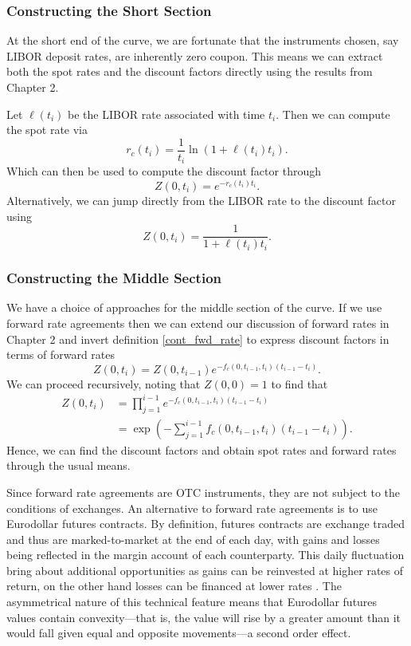 \subsubsection{Constructing the Short Section}
At the short end of the curve, we are fortunate that the instruments chosen, say LIBOR deposit rates, are inherently zero coupon. This means we can extract both the spot rates and the discount factors directly using the results from Chapter 2.

Let $\ell(t_i)$ be the LIBOR rate associated with time $t_i$. Then we can compute the spot rate via
\begin{equation}
    r_c(t_i) = \frac{1}{t_i} \ln ( 1 + \ell(t_i) t_i).
\end{equation}
Which can then be used to compute the discount factor through
\begin{equation}
    Z(0,t_i) = e^{-r_c(t_i) t_i}.
\end{equation}
Alternatively, we can jump directly from the LIBOR rate to the discount factor using
\begin{equation}
    Z(0,t_i) = \frac{1}{1 + \ell(t_i) t_i}.
\end{equation}

\subsubsection{Constructing the Middle Section}
We have a choice of approaches for the middle section of the curve. If we use forward rate agreements then we can extend our discussion of forward rates in Chapter 2 and invert definition \ref{cont_fwd_rate} to express discount factors in terms of forward rates
\begin{equation}
    Z(0,t_i) = Z(0,t_{i-1}) e^{- f_c(0,t_{i-1},t_i) (t_{i-1} - t_i)}.
\end{equation}
We can proceed recursively, noting that $Z(0,0) = 1$ to find that
\begin{align}
    Z(0,t_i) &= \prod_{j=1}^{i-1} e^{- f_c(0,t_{i-1},t_i) (t_{i-1} - t_i)} \\
    &= \exp \left( - \sum_{j=1}^{i-1} f_c(0,t_{i-1},t_i) (t_{i-1} - t_i) \right).
\end{align}
Hence, we can find the discount factors and obtain spot rates and forward rates through the usual means.

Since forward rate agreements are OTC instruments, they are not subject to the conditions of exchanges. An alternative to forward rate agreements is to use Eurodollar futures contracts. By definition, futures contracts are exchange traded and thus are marked-to-market at the end of each day, with gains and losses being reflected in the margin account of each counterparty. This daily fluctuation bring about additional opportunities as gains can be reinvested at higher rates of return, on the other hand losses can be financed at lower rates \citep{piterbarg2004eurodollar}. The asymmetrical nature of this technical feature means that Eurodollar futures values contain convexity––that is, the value will rise by a greater amount than it would fall given equal and opposite movements––a second order effect. 

